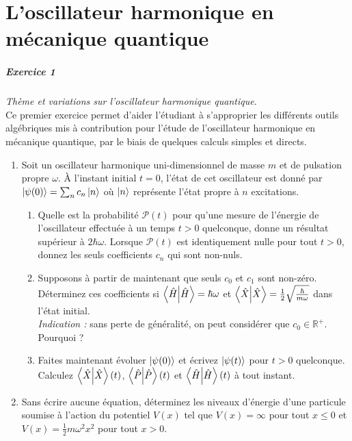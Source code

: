 \chapter{L'oscillateur harmonique en mécanique quantique}

\paragraph{Exercice 1} \textit{Thème et variations sur l'oscillateur harmonique quantique.} \\
Ce premier exercice permet d'aider l'étudiant à s'approprier les différents outils algébriques mis à contribution pour l'étude de l'oscillateur harmonique en mécanique quantique, par le biais de quelques calculs simples et directs.

\begin{enumerate}

\item Soit un oscillateur harmonique uni-dimensionnel de masse $m$ et de pulsation propre $\omega$. À l'instant initial $t=0$, l'état de cet oscillateur est donné par $\ket{\psi(0)} = \sum_n c_n \ket{n}$ où $\ket{n}$ représente l'état propre à $n$ excitations. 
	\begin{enumerate}
	\item Quelle est la probabilité $\mathcal P (t)$ pour qu'une mesure de l'énergie de l'oscillateur effectuée à un temps $t>0$ quelconque, donne un résultat supérieur à $2\hbar \omega$. Lorsque $\mathcal P(t)$ est identiquement nulle pour tout $t>0$, donnez les seuls coefficients $c_n$ qui sont non-nuls.
	\item Supposons à partir de maintenant que seuls $c_0$ et $c_1$ sont non-zéro. Déterminez ces coefficients si $\braket{\hat H} = \hbar \omega$ et $\braket{\hat X} = \frac{1}{2} \sqrt{\frac{\hbar}{m\omega}}$ dans l'état initial. \\
	\textit{Indication :} sans perte de généralité, on peut considérer que $c_0 \in \mathbb{R}^+$. Pourquoi ?
	\item Faites maintenant évoluer $\ket{\psi(0)}$ et écrivez $\ket{\psi(t)}$ pour $t>0$ quelconque. Calculez $\braket{\hat X}(t)$, $\braket{\hat P}(t)$ et $\braket{\hat H}(t)$ à tout instant. 
	\end{enumerate}

\item Sans écrire aucune équation, déterminez les niveaux d'énergie d'une particule soumise à l'action du potentiel $V(x)$ tel que $V(x) = \infty$ pour tout $x \leq 0$ et $V(x) = \frac{1}{2}m \omega^2 x^2$ pour tout $x>0$.


\end{enumerate}
